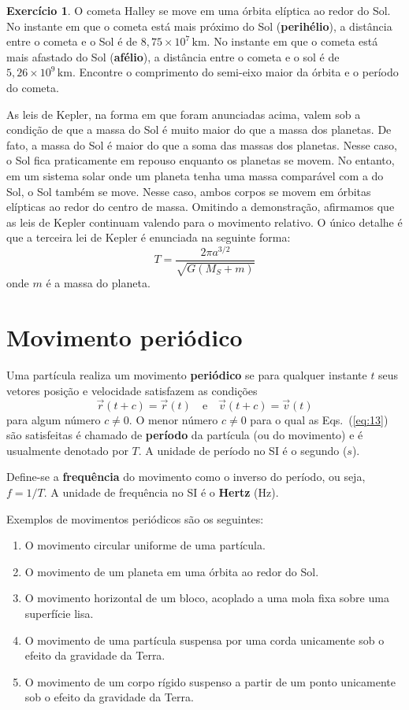 \documentclass[twocolumn=on,fontsize=12pt,DIV=calc]{scrartcl}
\theoremstyle{definition}
\newtheorem{ex}{Exercício}[section]
\begin{document}
\begin{ex}
  O cometa Halley se move em uma órbita elíptica ao redor do Sol. No
  instante em que o cometa está mais próximo do Sol
  (\textbf{perihélio}), a distância entre o cometa e o Sol é de
  $8{,}75\times 10^7\,\mathrm{km}$. No instante em que o cometa está
  mais afastado do Sol (\textbf{afélio}), a distância entre o cometa e
  o sol é de $5{,}26\times 10^9\,\mathrm{km}$. Encontre o comprimento
  do semi-eixo maior da órbita e o período do cometa.
\end{ex}

As leis de Kepler, na forma em que foram anunciadas acima, valem sob a
condição de que a massa do Sol é muito maior do que a massa dos
planetas. De fato, a massa do Sol é maior do que a soma das massas dos
planetas. Nesse caso, o Sol fica praticamente em repouso enquanto os
planetas se movem. No entanto, em um sistema solar onde um planeta
tenha uma massa comparável com a do Sol, o Sol também se move. Nesse
caso, ambos corpos se movem em órbitas elípticas ao redor do centro de
massa. Omitindo a demonstração, afirmamos que as leis de Kepler
continuam valendo para o movimento relativo. O único detalhe é que a
terceira lei de Kepler é enunciada na seguinte forma:
$$T=\frac{2\pi a^{3/2}}{\sqrt{G(M_S+m)}}$$
onde $m$ é a massa do planeta.

\section{Movimento periódico}
Uma partícula realiza um movimento \textbf{periódico} se para qualquer
instante $t$ seus vetores posição e velocidade satisfazem as condições
\begin{equation}
  \label{eq:13}
  \vec r(t+c)=\vec r(t)\quad\text{e}\quad\vec v(t+c)=\vec v(t)
\end{equation}
para algum número $c\ne 0$. O menor número $c\ne 0$ para o qual as
Eqs.~(\ref{eq:13}) são satisfeitas é chamado de \textbf{período} da
partícula (ou do movimento) e é usualmente denotado por $T$. A unidade
de período no SI é o segundo ($s$).

Define-se a \textbf{frequência} do movimento como o inverso do
período, ou seja, $f=1/T$. A unidade de frequência no SI é o
\textbf{Hertz} ($\mathrm{Hz}$).

Exemplos de movimentos periódicos são os seguintes:
\begin{enumerate}
\item O movimento circular uniforme de uma partícula.
\item O movimento de um planeta em uma órbita ao redor do Sol.
\item O movimento horizontal de um bloco, acoplado a uma mola fixa
  sobre uma superfície lisa.
\item O movimento de uma partícula suspensa por uma corda unicamente
  sob o efeito da gravidade da Terra.
\item O movimento de um corpo rígido suspenso a partir de um ponto
  unicamente sob o efeito da gravidade da Terra.
\end{enumerate}
\end{document}
